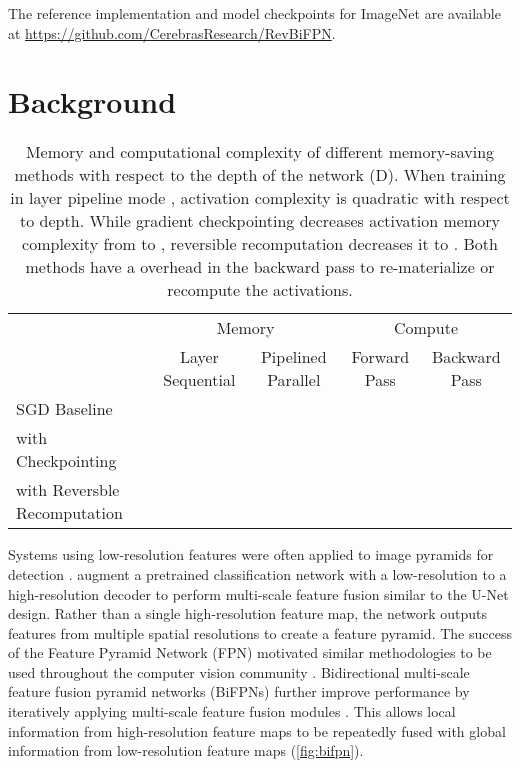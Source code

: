 \documentclass{article}
\begin{document}
The reference implementation and model checkpoints for ImageNet are available at \url{https://github.com/CerebrasResearch/RevBiFPN}.

\section{Background}
\label{sec:bgnd}

\begin{table*}
    \caption{
        Memory and computational complexity of different memory-saving methods with respect to the depth of the network (D).
        When training in layer pipeline mode \cite{ptrowski1993performanceAO, kosson2021pipelined}, activation complexity is quadratic with respect to depth. While gradient checkpointing decreases activation memory complexity from  to  \cite{yang2021pipemare}, reversible recomputation decreases it to . Both methods have a  overhead in the backward pass to re-materialize or recompute the activations.
    }
    \vskip 10pt
    \centering
    \small
    \sc
    \begin{tabular}{lcccc}
        \toprule
                                      &  \multicolumn{2}{c}{Memory}            &               \multicolumn{2}{c}{Compute} \\ 
                                      & Layer Sequential &  Pipelined Parallel &  Forward Pass & Backward Pass                     \\ \midrule
        SGD Baseline                  &            &             &         &  \\
        with Checkpointing            &     &   &  &  \\
        with Reversble Recomputation  &            &               &  &  \\
        \bottomrule
    \end{tabular}
    \label{tab:mem_comp_complex}
\end{table*}

Systems using low-resolution features were often applied to image pyramids for detection \cite{girshick2015fast, ren2015faster, redmon2016you, redmon2017yolo9000}.
\citet{lin2017feature} augment a pretrained classification network with a low-resolution to a high-resolution decoder to perform multi-scale feature fusion similar to the U-Net design.
Rather than a single high-resolution feature map, the network outputs features from multiple spatial resolutions to create a feature pyramid.
The success of the Feature Pyramid Network (FPN) motivated similar methodologies to be used throughout the computer vision community \cite{redmon2018yolov3, bochkovskiy2020yolov4, he2017mask, lin2017focal, goyal2021nondeep}.
Bidirectional multi-scale feature fusion pyramid networks (BiFPNs) further improve performance by iteratively applying multi-scale feature fusion modules \cite{tan2020efficientdet, ghiasi2019nasfpn, liu2018path, cai2018cascade, chen2018cascaded}.
This allows local information from high-resolution feature maps to be repeatedly fused with global information from low-resolution feature maps (\cref{fig:bifpn}).
\end{document}
